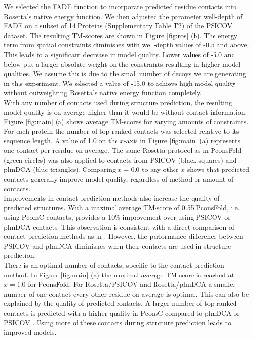 \documentclass{bioinfo}
\begin{document}
We selected the FADE function to incorporate predicted residue contacts into Rosetta's native energy function. We then adjusted the parameter well-depth of FADE on a subset of 14 Proteins (Supplementary Table T2) of the PSICOV dataset. The resulting TM-scores are shown in Figure \ref{fig:ros} (b). The energy term from spatial constraints diminishes with well-depth values of -0.5 and above. This leads to a significant decrease in model quality. Lower values of -5.0 and below put a larger absolute weight on the constraints resulting in higher model qualities. We assume this is due to the small number of decoys we are generating in this experiment. We selected a value of -15.0 to achieve high model quality without outweighting Rosetta's native energy function completely.\\\indent
With any number of contacts used during structure prediction, the resulting model quality is on average higher than it would be without contact information. Figure \ref{fig:main} (a) shows average TM-scores for varying amounts of constraints. For each protein the number of top ranked contacts was selected relative to its sequence length. A value of 1.0 on the $x$-axis in Figure \ref{fig:main} (a) represents one contact per residue on average. The same Rosetta protocol as in PconsFold (green circles) was also applied to contacts from PSICOV (black squares) and plmDCA (blue triangles). Comparing $x=0.0$ to any other $x$ shows that predicted contacts generally improve model quality, regardless of method or amount of contacts. \\\indent
Improvements in contact prediction methods also increase the quality of predicted structures. With a maximal average TM-score of 0.55 PconsFold, i.e. using PconsC contacts, provides a 10\% improvement over using PSICOV or plmDCA contacts. This observation is consistent with a direct comparison of contact prediction methods as in \citeauthor{skwark_pconsc:_2013} \citeyear{skwark_pconsc:_2013}. However, the performance difference between PSICOV and plmDCA diminishes when their contacts are used in structure prediction. \\\indent
There is an optimal number of contacts, specific to the contact prediction method. In Figure \ref{fig:main} (a) the maximal average TM-score is reached at $x=1.0$ for PconsFold. For Rosetta/PSICOV and Rosetta/plmDCA a smaller number of one contact every other residue on average is optimal. This can also be explained by the quality of predicted contacts. A larger number of top ranked contacts is predicted with a higher quality in PconsC compared to plmDCA or PSICOV \cite[]{skwark_pconsc:_2013}. Using more of these contacts during structure prediction leads to improved models. \\\indent
\end{document}
